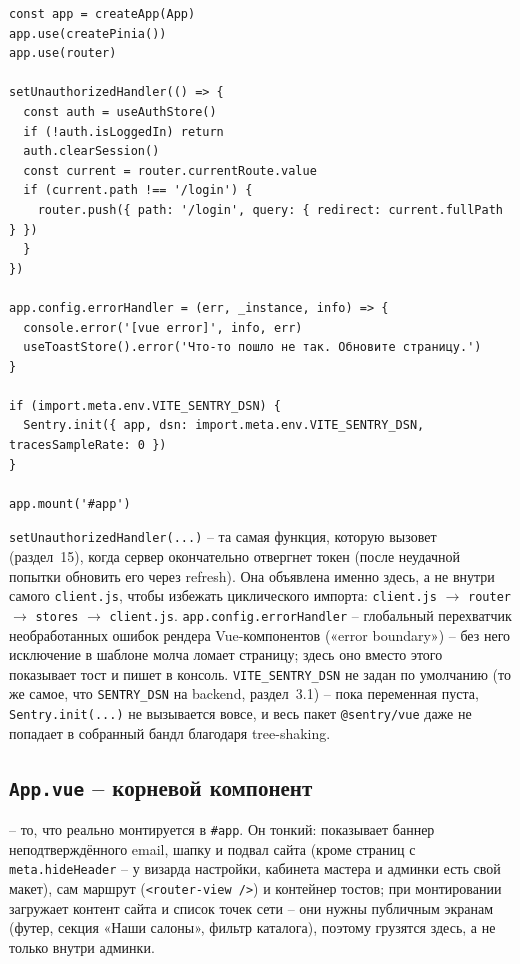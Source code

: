 \begin{verbatim}
const app = createApp(App)
app.use(createPinia())
app.use(router)

setUnauthorizedHandler(() => {
  const auth = useAuthStore()
  if (!auth.isLoggedIn) return
  auth.clearSession()
  const current = router.currentRoute.value
  if (current.path !== '/login') {
    router.push({ path: '/login', query: { redirect: current.fullPath } })
  }
})

app.config.errorHandler = (err, _instance, info) => {
  console.error('[vue error]', info, err)
  useToastStore().error('Что-то пошло не так. Обновите страницу.')
}

if (import.meta.env.VITE_SENTRY_DSN) {
  Sentry.init({ app, dsn: import.meta.env.VITE_SENTRY_DSN, tracesSampleRate: 0 })
}

app.mount('#app')
\end{verbatim}

\texttt{setUnauthorizedHandler(...)} -- та самая функция, которую вызовет
 (раздел~15), когда сервер окончательно отвергнет
токен (после неудачной попытки обновить его через refresh). Она объявлена
именно здесь, а не внутри самого \texttt{client.js}, чтобы избежать
циклического импорта: \texttt{client.js} $\to$ \texttt{router} $\to$
\texttt{stores} $\to$ \texttt{client.js}. \texttt{app.config.errorHandler} --
глобальный перехватчик необработанных ошибок рендера Vue-компонентов
(«error boundary») -- без него исключение в шаблоне молча ломает
страницу; здесь оно вместо этого показывает тост и пишет в консоль.
\texttt{VITE_SENTRY_DSN} не задан по умолчанию (то же самое, что
\texttt{SENTRY_DSN} на backend, раздел~3.1) -- пока переменная пуста,
\texttt{Sentry.init(...)} не вызывается вовсе, и весь пакет
\texttt{@sentry/vue} даже не попадает в собранный бандл благодаря
tree-shaking.

\subsection{\texttt{App.vue} -- корневой компонент}

 -- то, что реально монтируется в
\texttt{\#app}. Он тонкий: показывает баннер неподтверждённого email,
шапку и подвал сайта (кроме страниц с \texttt{meta.hideHeader} --
у визарда настройки, кабинета мастера и админки есть свой макет), сам
маршрут (\texttt{<router-view />}) и контейнер тостов; при монтировании
загружает контент сайта и список точек сети -- они нужны публичным
экранам (футер, секция «Наши салоны», фильтр каталога), поэтому грузятся
здесь, а не только внутри админки.

